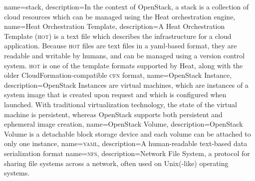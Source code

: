 {
  name={stack},
  description={In the context of \gls{OpenStack}, a stack is a
  collection of cloud resources which can be managed using the
  \gls{Heat} orchestration engine},
}
{
  name={Heat Orchestration Template},
  description={A \gls{Heat} Orchestration Template (\textsc{hot}) is a text
  file which describes the infrastructure for a cloud application.
  Because \textsc{hot} files are text files in a \gls{yaml}-based format, they
  are readable and writable by humans, and can be managed using a
  version control system.  \textsc{hot} is one of the template formats
  supported by Heat, along with the older CloudFormation-compatible
  \textsc{cfn} format},
}
{
  name={OpenStack Instance},
  description={OpenStack Instances are virtual machines, which are
  instances of a system image that is created upon request and which
  is configured when launched. With traditional virtualization
  technology, the state of the virtual machine is persistent, whereas
  OpenStack supports both persistent and ephemeral image creation},
}
{
  name={OpenStack Volume},
  description={OpenStack Volume is a detachable block storage device
  and each volume can be attached to only one instance},
}
{
  name={\textsc{yaml}},
  description={A human-readable text-based data serialization
  format}
}
{
  name={\textsc{nfs}},
  description={Network File System, a protocol for sharing file
    systems across a network, often used on Unix(-like) operating
    systems.}
}
